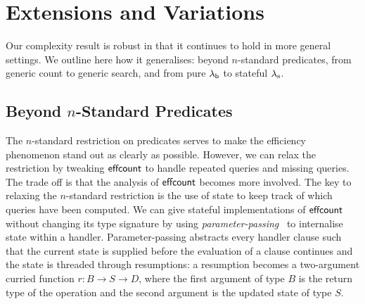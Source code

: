 \documentclass[12pt,phd,lfcs,twoside,openright,logo,leftchapter,normalheadings]{infthesis}
\theoremstyle{plain}
\theoremstyle{definition}
\begin{document}
\section{Extensions and Variations}
\label{sec:robustness}

Our complexity result is robust in that it continues to hold in more
general settings. We outline here how it generalises: beyond
$n$-standard predicates, from generic count to generic search, and
from pure $\lambda_{\mathsf{b}}$ to stateful $\lambda_{\textrm{\normalfont s}}$.

\subsection{Beyond $n$-Standard Predicates}
\label{sec:beyond}
The $n$-standard restriction on predicates serves to make the
efficiency phenomenon stand out as clearly as possible. However, we
can relax the restriction by tweaking $\mathsf{effcount}$ to handle repeated
queries and missing queries.
%
The trade off is that the analysis of $\mathsf{effcount}$ becomes more involved.
%
The key to relaxing the $n$-standard restriction is the use of state
to keep track of which queries have been computed.
%
We can give stateful implementations of $\mathsf{effcount}$ without changing its
type signature by using \emph{parameter-passing}~\citep{KammarLO13,
  Pretnar15} to internalise state within a handler.
%
Parameter-passing abstracts every handler clause such that the current
state is supplied before the evaluation of a clause continues and the
state is threaded through resumptions: a resumption becomes a
two-argument curried function $r : B \to S \to D$, where the first
argument of type $B$ is the return type of the operation and the
second argument is the updated state of type $S$.
\end{document}
